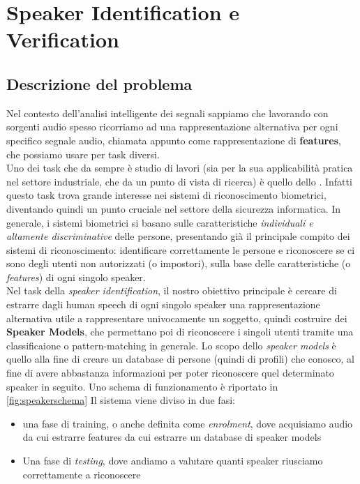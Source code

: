 \chapter{Speaker Identification e Verification}
\label{ch:speakerID}

\section{Descrizione del problema}
Nel contesto dell'analisi intelligente dei segnali sappiamo che lavorando con sorgenti audio spesso ricorriamo ad una rappresentazione alternativa per ogni specifico 
segnale audio, chiamata appunto come rappresentazione di \textbf{features}, che possiamo usare per task diversi. \\
Uno dei task che da sempre è studio di lavori (sia per la sua applicabilità pratica nel settore industriale, che da un punto di vista di ricerca) è quello 
dello . Infatti questo task trova grande interesse nei sistemi di riconoscimento biometrici, diventando quindi un punto cruciale nel 
settore della sicurezza informatica. In generale, i sistemi biometrici si basano sulle caratteristiche \textit{individuali e altamente discriminative} delle persone, 
presentando già il principale compito dei sistemi di riconoscimento: identificare correttamente le persone e riconoscere se ci sono degli utenti non autorizzati (o impostori), 
sulla base delle caratteristiche (o \textit{features}) di ogni singolo speaker. \\
Nel task della \textit{speaker identification}, il nostro obiettivo principale è cercare di estrarre dagli human speech di ogni singolo speaker una rappresentazione alternativa 
utile a rappresentare univocamente un soggetto, quindi costruire dei \textbf{Speaker Models}, che permettano poi di riconoscere i singoli utenti tramite una classificaione 
o pattern-matching in generale. Lo scopo dello \textit{speaker models} è quello  alla fine di creare un database di persone (quindi di profili) che conosco, al fine di avere 
abbastanza informazioni per poter riconoscere quel determinato speaker in seguito. 
Uno schema di funzionamento è riportato in \ref{fig:speakerschema} Il sistema viene diviso in due fasi:
\begin{itemize}
    \item una fase di training, o anche definita come \textit{enrolment}, dove acquisiamo audio da cui estrarre features da cui estrarre un database di speaker models
    \item Una fase di \textit{testing}, dove andiamo a valutare quanti speaker riusciamo correttamente a riconoscere 
\end{itemize}
